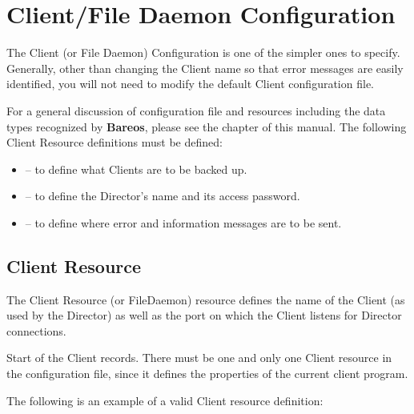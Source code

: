 
\chapter{Client/File Daemon Configuration}
\label{FiledConfChapter}

The Client (or File Daemon) Configuration is one of the simpler ones to
specify. Generally, other than changing the Client name so that error messages
are easily identified, you will not need to modify the default Client
configuration file.

For a general discussion of configuration file and resources including the
data types recognized by {\bf Bareos}, please see the
 chapter of this manual. The
following Client Resource definitions must be defined:

\begin{itemize}
\item
    -- to define what Clients are  to
   be backed up.
\item
    -- to  define the Director's
   name and its access password.
\item
    -- to define where error  and
   information messages are to be sent.
\end{itemize}

\section{Client Resource}
\label{ClientResourceClient}

The Client Resource (or FileDaemon) resource defines the name of the Client
(as used by the Director) as well as the port on which the Client listens for
Director connections.

Start of the Client records.  There must be one and only one Client resource
in the  configuration file, since it defines the properties of the  current
client program.





The following is an example of a valid Client resource definition:

